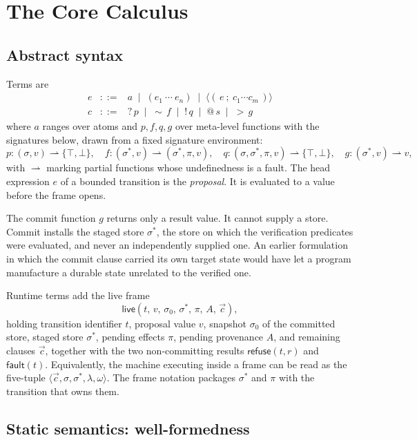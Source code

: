 \documentclass[11pt]{article}
\newcommand{\cfg}[1]{\langle #1\rangle}
\newcommand{\live}{\mathsf{live}}
\newcommand{\refuseval}{\mathsf{refuse}}
\newcommand{\faultval}{\mathsf{fault}}
\begin{document}
\section{The Core Calculus}\label{s:core}

\subsection{Abstract syntax}

Terms are
\[
\begin{array}{rcl}
e & ::= & a \;\mid\; (e_1\ \cdots\ e_n) \;\mid\; \langle\!(\,e\ ;\ c_1\cdots c_m\,)\!\rangle \\[2pt]
c & ::= & {?}\,p \;\mid\; {\sim}\,f \;\mid\; {!}\,q \;\mid\; {@}\,s \;\mid\; {>}\,g
\end{array}
\]
where $a$ ranges over atoms and $p,f,q,g$ over meta-level functions with the signatures below, drawn from a fixed signature environment:
\[
p:(\sigma,v)\rightharpoonup\{\top,\bot\},\quad
f:(\sigma^{\ast},v)\rightharpoonup(\sigma^{\ast},\pi,v),\quad
q:(\sigma,\sigma^{\ast},\pi,v)\rightharpoonup\{\top,\bot\},\quad
g:(\sigma^{\ast},v)\rightharpoonup v,
\]
with $\rightharpoonup$ marking partial functions whose undefinedness is a fault. The head expression $e$ of a bounded transition is the \emph{proposal}. It is evaluated to a value before the frame opens.

The commit function $g$ returns only a result value. It cannot supply a store. Commit installs the staged store $\sigma^{\ast}$, the store on which the verification predicates were evaluated, and never an independently supplied one. An earlier formulation in which the commit clause carried its own target state would have let a program manufacture a durable state unrelated to the verified one.

Runtime terms add the live frame
\[
\live(t,\,v,\,\sigma_0,\,\sigma^{\ast},\,\pi,\,A,\,\vec c),
\]
holding transition identifier $t$, proposal value $v$, snapshot $\sigma_0$ of the committed store, staged store $\sigma^{\ast}$, pending effects $\pi$, pending provenance $A$, and remaining clauses $\vec c$, together with the two non-committing results $\refuseval(t,r)$ and $\faultval(t)$. Equivalently, the machine executing inside a frame can be read as the five-tuple $\cfg{\vec c,\sigma,\sigma^{\ast},\lambda,\omega}$. The frame notation packages $\sigma^{\ast}$ and $\pi$ with the transition that owns them.

\subsection{Static semantics: well-formedness}
\end{document}
